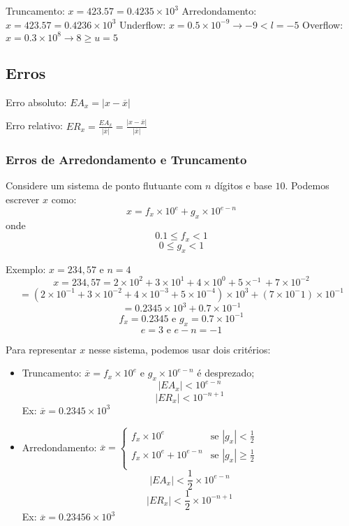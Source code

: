 \documentclass[a4paper,oneside,article,table]{article}
\begin{document}
    Truncamento: $x = 423.5\boxed{7} = 0.4235 \times 10^3$
    Arredondamento: $x = 423.5\boxed{7} = 0.4236 \times 10^3$
    Underflow: $x = 0.5 \times 10^{-9} \rightarrow -9 < l = -5$
    Overflow: $x = 0.3 \times 10^8 \rightarrow 8 \ge u = 5$

    \subsection{Erros}

    \begin{description}

        \item Erro absoluto: ${EA}_x = |x - \overline{x}|$
        \item Erro relativo: ${ER}_x = \frac{{EA}_x}{|\overline{x}|} = \frac{|x - \overline{x}|}{|\overline{x}|}$

    \end{description}

    \subsubsection{Erros de Arredondamento e Truncamento}
    Considere um sistema de ponto flutuante com $n$ dígitos e base $10$. Podemos escrever $x$ como:
    \[x = f_x \times 10^e + g_x \times 10^{e-n}\]
    onde
    \[0.1 \leq f_x < 1\]
    \[0 \leq g_x < 1\]

    Exemplo: $x=234,57$ e $n=4$
    \[x = 234,57 = 2 \times 10^2 + 3 \times 10^1 + 4 \times 10^0 + 5 \times^{-1} + 7 \times 10^{-2}\]
    \[= (2 \times 10^{-1} + 3 \times 10^{-2} + 4 \times 10^{-3} + 5 \times 10^{-4}) \times 10^3 + (7 \times 10^-1) \times 10^{-1}\]
    \[= 0.2345 \times 10^{3} + 0.7 \times 10^{-1}\]
    \[f_x = 0.2345 \textrm{ e } g_x =0.7 \times 10^{-1}\]
    \[e = 3 \textrm{ e } e-n = -1\]

    Para representar $x$ nesse sistema, podemos usar dois critérios:
    \begin{itemize}
        \item Truncamento: $\overline{x} = f_x \times 10^e$ e $g_x \times 10^{e-n}$ é desprezado;\\
            \[|EA_x| < 10^{e-n}\]
            \[|ER_x| < 10^{-n+1}\]
            Ex: $\overline{x} = 0.2345 \times 10^3$
        \item Arredondamento: $\overline{x} = \begin{cases}
                f_x  \times 10^e & \text{se $|g_x| < \frac{1}{2}$}\\
                f_x  \times 10^e  + 10^{e - n} & \text{se $|g_x| \geq \frac{1}{2}$}\\
            \end{cases}$\\
            \[|EA_x| < \frac{1}{2} \times 10^{e-n}\]
            \[|ER_x| < \frac{1}{2} \times 10^{-n+1}\]
            Ex: $\overline{x} = 0.23456 \times 10^3$
    \end{itemize}
\end{document}
